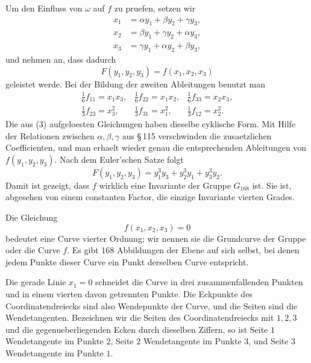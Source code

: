 \documentclass[11pt]{article}
\begin{document}
Um den Einfluss von \(\omega\) auf \(f\) zu pruefen, setzen wir
\begin{equation}
\begin{aligned}
x_1&=\alpha y_1+\beta y_2+\gamma y_3,\\
x_2&=\beta y_1+\gamma y_2+\alpha y_3,\\
x_3&=\gamma y_1+\alpha y_2+\beta y_3,
\end{aligned}
\tag{3}
\end{equation}
und nehmen an, dass dadurch
\begin{equation}
F(y_1,y_2,y_3)=f(x_1,x_2,x_3)
\tag{4}
\end{equation}
geleistet werde. Bei der Bildung der zweiten Ableitungen benutzt man
\begin{equation}
\begin{array}{lll}
\frac16 f_{11}=x_1x_3,&\frac16 f_{22}=x_1x_2,&\frac16 f_{33}=x_2x_3,\\[2mm]
\frac13 f_{23}=x_3^2,&\frac13 f_{31}=x_1^2,&\frac13 f_{12}=x_2^2.
\end{array}
\end{equation}
Die aus (3) aufgeloesten Gleichungen haben dieselbe cyklische Form. Mit Hilfe der Relationen zwischen \(\alpha,\beta,\gamma\) aus \S\,115 verschwinden die zusaetzlichen Coefficienten, und man erhaelt wieder genau die entsprechenden Ableitungen von \(f(y_1,y_2,y_3)\). Nach dem Euler'schen Satze folgt
\begin{equation}
F(y_1,y_2,y_3)=y_1^3y_3+y_2^3y_1+y_3^3y_2.
\end{equation}
Damit ist gezeigt, dass \(f\) wirklich eine Invariante der Gruppe \(G_{168}\) ist. Sie ist, abgesehen von einem constanten Factor, die einzige Invariante vierten Grades.

Die Gleichung
\begin{equation}
f(x_1,x_2,x_3)=0
\tag{5}
\end{equation}
bedeutet eine Curve vierter Ordnung; wir nennen sie die Grundcurve der Gruppe oder die Curve \(f\). Es gibt 168 Abbildungen der Ebene auf sich selbst, bei denen jedem Punkte dieser Curve ein Punkt derselben Curve entspricht.

Die gerade Linie \(x_1=0\) schneidet die Curve in drei zusammenfallenden Punkten und in einem vierten davon getrennten Punkte. Die Eckpunkte des Coordinatendreiecks sind also Wendepunkte der Curve, und die Seiten sind die Wendetangenten. Bezeichnen wir die Seiten des Coordinatendreiecks mit \(1,2,3\) und die gegenueberliegenden Ecken durch dieselben Ziffern, so ist Seite \(1\) Wendetangente im Punkte \(2\), Seite \(2\) Wendetangente im Punkte \(3\), und Seite \(3\) Wendetangente im Punkte \(1\).
\end{document}
